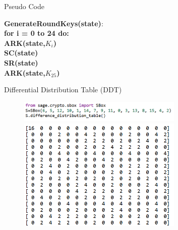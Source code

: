 \begin{frame}{Pseudo Code}
    \begin{block}{}
    \textbf{GenerateRoundKeys(state)}:\\
\hspace*{1cm}\textbf{for i = 0 to 24 do:}\\
\hspace*{2cm}\textbf{ARK(state,$K_i$)}\\
\hspace*{2cm}\textbf{SC(state)}\\
\hspace*{2cm}\textbf{SR(state)}\\
\hspace*{1cm}\textbf{ARK(state,$K_{25}$)}\\
    \end{block}
\end{frame}

\begin{frame}{Differential Distribution Table (DDT)}
\begin{block}{}
    \begin{figure}[H]
    \centering
    \includegraphics[width=0.7\textwidth]{Screenshot 2024-11-30 141729.png}
    \includegraphics[width=0.7\textwidth]{Screenshot 2024-11-30 141742.png}
\end{figure}
    
\end{block}
\end{frame}

